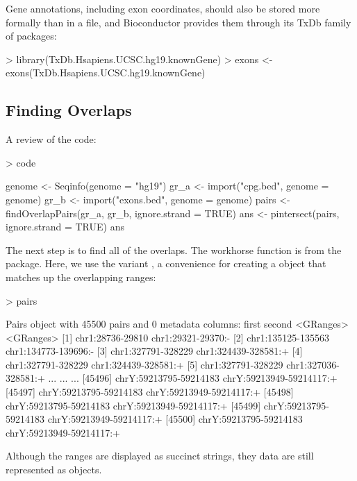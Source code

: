 \documentclass[10pt]{article}
\begin{document}
Gene annotations, including exon coordinates, should also be stored
more formally than in a file, and Bioconductor provides them through
its TxDb family of packages:
\begin{Schunk}
\begin{Sinput}
> library(TxDb.Hsapiens.UCSC.hg19.knownGene)
> exons <- exons(TxDb.Hsapiens.UCSC.hg19.knownGene)
\end{Sinput}
\end{Schunk}

\subsection{Finding Overlaps}

A review of the code:
\begin{Schunk}
\begin{Sinput}
> code
\end{Sinput}
\begin{Soutput}
{
    genome <- Seqinfo(genome = "hg19")
    gr_a <- import("cpg.bed", genome = genome)
    gr_b <- import("exons.bed", genome = genome)
    pairs <- findOverlapPairs(gr_a, gr_b, ignore.strand = TRUE)
    ans <- pintersect(pairs, ignore.strand = TRUE)
    ans
}
\end{Soutput}
\end{Schunk}

The next step is to find all of the overlaps. The workhorse function
is  from the  package. Here,
we use the variant , a convenience for
creating a  object that matches up the overlapping
ranges:
\begin{Schunk}
\begin{Sinput}
> pairs
\end{Sinput}
\begin{Soutput}
Pairs object with 45500 pairs and 0 metadata columns:
                           first                   second
                       <GRanges>                <GRanges>
      [1]       chr1:28736-29810       chr1:29321-29370:-
      [2]     chr1:135125-135563     chr1:134773-139696:-
      [3]     chr1:327791-328229     chr1:324439-328581:+
      [4]     chr1:327791-328229     chr1:324439-328581:+
      [5]     chr1:327791-328229     chr1:327036-328581:+
      ...                    ...                      ...
  [45496] chrY:59213795-59214183 chrY:59213949-59214117:+
  [45497] chrY:59213795-59214183 chrY:59213949-59214117:+
  [45498] chrY:59213795-59214183 chrY:59213949-59214117:+
  [45499] chrY:59213795-59214183 chrY:59213949-59214117:+
  [45500] chrY:59213795-59214183 chrY:59213949-59214117:+
\end{Soutput}
\end{Schunk}
Although the ranges are displayed as succinct strings, they data are
still represented as  objects.
\end{document}
